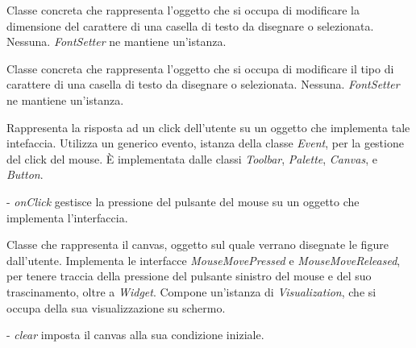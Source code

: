 Classe concreta che rappresenta l'oggetto che si occupa di modificare la dimensione del carattere di una casella di testo da disegnare o selezionata.
Nessuna.
\textit{FontSetter} ne mantiene un'istanza.

Classe concreta che rappresenta l'oggetto che si occupa di modificare il tipo di carattere di una casella di testo da disegnare o selezionata.
Nessuna.
\textit{FontSetter} ne mantiene un'istanza.

Rappresenta la risposta ad un click dell'utente su un oggetto che implementa tale intefaccia.
Utilizza un generico evento, istanza della classe \textit{Event}, per la gestione del click del mouse.
\`E implementata dalle classi \textit{Toolbar}, \textit{Palette}, \textit{Canvas}, e \textit{Button}. 
\begin{elencopuntato}[\normindent]
\item[-]  \textit{onClick} gestisce la pressione del pulsante del mouse su un oggetto che implementa l'interfaccia.
\end{elencopuntato}

Classe che rappresenta il canvas, oggetto sul quale verrano disegnate le figure dall'utente.
Implementa le interfacce \textit{MouseMovePressed} e \textit{MouseMoveReleased}, per tenere traccia della pressione del pulsante sinistro del mouse e del suo trascinamento, oltre a \textit{Widget}.
Compone un'istanza di \textit{Visualization}, che si occupa della sua visualizzazione su schermo.
\begin{elencopuntato}[\normindent]
\item[-]  \textit{clear} imposta il canvas alla sua condizione iniziale.
\end{elencopuntato}


